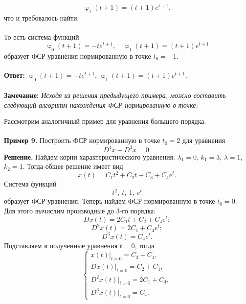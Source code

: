 \documentclass[a4paper, 12pt]{article}
\renewcommand{\varphi}{\upvarphi}
\begin{document}
$$\varphi_1(t+1) = (t+1)e^{t+1},$$
что и требовалось найти.\\\\
То есть система функций $$\varphi_0(t+1)= -te^{t+1},\quad\varphi_1(t+1) = (t+1)e^{t+1}$$ образует ФСР уравнения нормированную в точке $t_0 = -1$.\\\\
\textbf{Ответ:} $\varphi_0(t+1)= -te^{t+1}$, $\varphi_1(t+1) = (t+1)e^{t+1}$.\\\\
\textbf{Замечание:} \textit{Исходя из решения предыдущего примера, можно составить следующий алгоритм нахождения ФСР нормированную в точке:}
Рассмотрим аналогичный пример для уравнения большего порядка.\\\\
\textbf{Пример 9.} Построить ФСР нормированную в точке $t_0 = 2$ для уравнения $$D^4x-D^3x = 0.$$
\textbf{Решение.} Найдем корни характеристического уравнения: $\lambda_1 = 0$, $k_1 = 3$; $\lambda = 1$, $k_2 = 1$. Тогда общее решение имеет вид $$x(t) = C_1t^2 + C_2t + C_3 + C_4e^t.$$
Система функций $$t^2,\ t,\ 1,\ e^t$$ образует ФСР уравнения.
Теперь найдем ФСР нормированную в точке $t_0 = 0$. Для этого вычислим производные до 3-го порядка:
$$Dx(t) = 2C_1t + C_2 + C_4e^t;$$
$$D^2x(t) = 2C_1 + C_4e^t;$$
$$D^3x(t) = C_4e^t.$$
Подставляем в полученные уравнения $t = 0$, тогда
$$\begin{cases}
	x(t)|_{t=0} = C_3 + C_4,\\
	Dx(t)|_{t=0} = C_2 + C_4,\\
	D^2x(t)|_{t=0} = 2C_1 + C_4,\\
	D^3x(t)|_{t=0} = C_4.
\end{cases}$$
\end{document}
